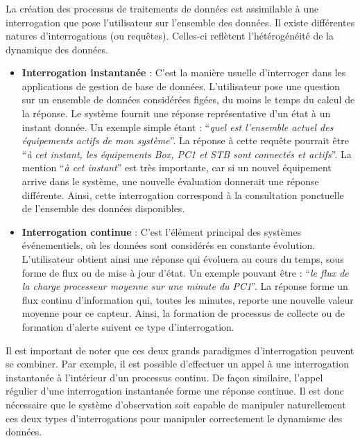 \subsubsection{\critereBA}
La création des processus de traitements de données est assimilable à une interrogation que pose l'utilisateur sur l'ensemble des données. Il existe différentes natures d'interrogations (ou requêtes). Celles-ci reflètent l'hétérogénéité de la dynamique des données.
\begin{itemize}
    \item \textbf{Interrogation instantanée} : C'est la manière usuelle d'interroger dans les applications de gestion de base de données. L'utilisateur pose une question sur un ensemble de données considérées figées, du moins le temps du calcul de la réponse. Le système fournit une réponse représentative d'un état à un instant donnée. Un exemple simple étant : \enquote{\it quel est l'ensemble actuel des équipements actifs de mon système}. La réponse à cette requête pourrait être \enquote{\it à cet instant, les équipements Box, PC1 et STB sont connectés et actifs}. La mention \enquote{\it à cet instant} est très importante, car si un nouvel équipement arrive dans le système, une nouvelle évaluation donnerait une réponse différente. Ainsi, cette interrogation correspond à la consultation ponctuelle de l'ensemble des données disponibles.
    \item \textbf{Interrogation continue} : C'est l'élément principal des systèmes événementiels, où les données sont considérés en constante évolution. L'utilisateur obtient ainsi une réponse qui évoluera au cours du temps, sous forme de flux ou de mise à jour d'état. Un exemple pouvant être : \enquote{\it le flux de la charge processeur moyenne sur une minute du PC1}. La réponse forme un flux continu d'information qui, toutes les minutes, reporte une nouvelle valeur moyenne pour ce capteur. Ainsi, la formation de processus de collecte ou de formation d'alerte suivent ce type d'interrogation.
\end{itemize}
Il est important de noter que ces deux grands paradigmes d'interrogation peuvent se combiner. Par exemple, il est possible d'effectuer un appel à une interrogation instantanée à l'intérieur d'un processus continu. De façon similaire, l'appel régulier d'une interrogation instantanée forme une réponse continue. Il est donc nécessaire que le système d'observation soit capable de manipuler naturellement ces deux types d'interrogations pour manipuler correctement le dynamisme des données.

